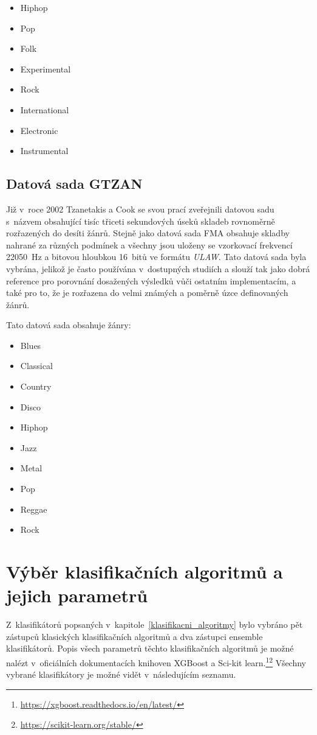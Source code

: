 \begin{itemize}
    \item Hiphop
    \item Pop
    \item Folk
    \item Experimental
    \item Rock
    \item International
    \item Electronic
    \item Instrumental
\end{itemize}

\subsection*{Datová sada GTZAN}
Již v~roce 2002 Tzanetakis a Cook se svou prací zveřejnili datovou sadu s~názvem  obsahující tisíc třiceti sekundových úseků skladeb rovnoměrně rozřazených do desíti žánrů. Stejně jako datová sada FMA obsahuje skladby nahrané za různých podmínek a všechny jsou uloženy se vzorkovací frekvencí 22050~Hz a bitovou hloubkou 16~bitů ve formátu \textit{ULAW}. Tato datová sada byla vybrána, jelikož je často používána v~dostupných studiích a slouží tak jako dobrá reference pro porovnání dosažených výsledků vůči ostatním implementacím, a také pro to, že je rozřazena do velmi známých a poměrně úzce definovaných žánrů.\cite{1021072}

Tato datová sada obsahuje žánry:

\begin{itemize}
    \item Blues
    \item Classical
    \item Country
    \item Disco
    \item Hiphop
    \item Jazz
    \item Metal
    \item Pop
    \item Reggae
    \item Rock
\end{itemize}

\section{Výběr klasifikačních algoritmů a jejich parametrů}
\label{NIS_vyber_klasifikacnich_algoritmu_a_jejich_parametru}
Z~klasifikátorů popsaných v~kapitole~\ref{klasifikacni_algoritmy} bylo vybráno pět zástupců klasických klasifikačních algoritmů a dva zástupci ensemble klasifikátorů. Popis všech parametrů těchto klasifikačních algoritmů je možné nalézt v~oficiálních dokumentacích knihoven XGBoost a Sci-kit learn.\footnote{\url{https://xgboost.readthedocs.io/en/latest/}}\footnote{\url{https://scikit-learn.org/stable/}} Všechny vybrané klasifikátory je možné vidět v~následujícím seznamu.

